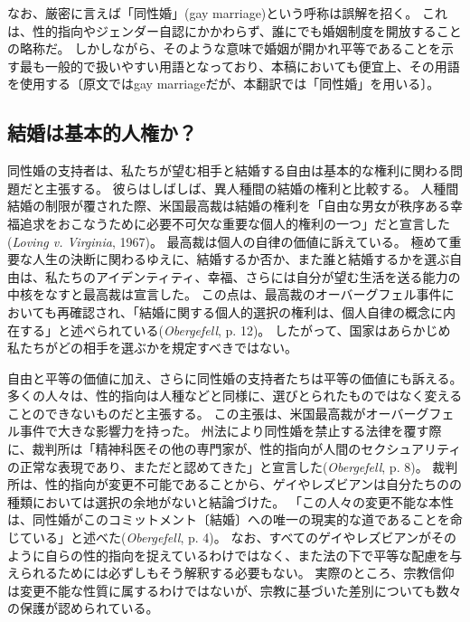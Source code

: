 \documentclass[paper=a4,book,openany]{jlreq} \usepackage{mystyle}
\begin{document}
なお、厳密に言えば「同性婚」(gay marriage)という呼称は誤解を招く。
これは、性的指向やジェンダー自認にかかわらず、誰にでも婚姻制度を開放することの略称だ。
しかしながら、そのような意味で婚姻が開かれ平等であることを示す最も一般的で扱いやすい用語となっており、本稿においても便宜上、その用語を使用する〔原文ではgay marriageだが、本翻訳では「同性婚」を用いる〕。

\subsection{結婚は基本的人権か？}

同性婚の支持者は、私たちが望む相手と結婚する自由は基本的な権利に関わる問題だと主張する。
彼らはしばしば、異人種間の結婚の権利と比較する。
人種間結婚の制限が覆された際、米国最高裁は結婚の権利を「自由な男女が秩序ある幸福追求をおこなうために必要不可欠な重要な個人的権利の一つ」だと宣言した(\emph{Loving v. Virginia}, 1967)。
最高裁は個人の自律の価値に訴えている。
極めて重要な人生の決断に関わるゆえに、結婚するか否か、また誰と結婚するかを選ぶ自由は、私たちのアイデンティティ、幸福、さらには自分が望む生活を送る能力の中核をなすと最高裁は宣言した。
この点は、最高裁のオーバーグフェル事件においても再確認され、「結婚に関する個人的選択の権利は、個人自律の概念に内在する」と述べられている(\emph{Obergefell}, p. 12)。
したがって、国家はあらかじめ私たちがどの相手を選ぶかを規定すべきではない。

自由と平等の価値に加え、さらに同性婚の支持者たちは平等の価値にも訴える。
多くの人々は、性的指向は人種などと同様に、選びとられたものではなく変えることのできないものだと主張する。
この主張は、米国最高裁がオーバーグフェル事件で大きな影響力を持った。
州法により同性婚を禁止する法律を覆す際に、裁判所は「精神科医その他の専門家が、性的指向が人間のセクシュアリティの正常な表現であり、まただと認めてきた」と宣言した(\emph{Obergefell}, p. 8)。
裁判所は、性的指向が変更不可能であることから、ゲイやレズビアンは自分たちのの種類においては選択の余地がないと結論づけた。
「この人々の変更不能な本性は、同性婚がこのコミットメント〔結婚〕への唯一の現実的な道であることを命じている」と述べた(\emph{Obergefell}, p. 4)。
なお、すべてのゲイやレズビアンがそのように自らの性的指向を捉えているわけではなく、また法の下で平等な配慮を与えられるためには必ずしもそう解釈する必要もない。
実際のところ、宗教信仰は変更不能な性質に属するわけではないが、宗教に基づいた差別についても数々の保護が認められている。
\end{document}
